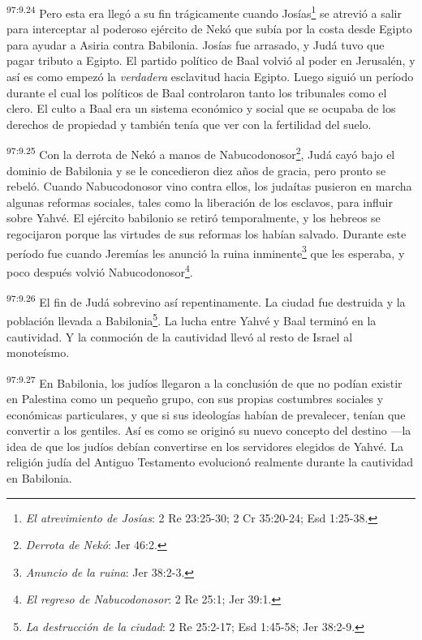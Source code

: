 \par
\textsuperscript{97:9.24} Pero esta era llegó a su fin trágicamente cuando Josías\footnote{\textit{El atrevimiento de Josías}: 2 Re 23:25-30; 2 Cr 35:20-24; Esd 1:25-38.} se atrevió a salir para interceptar al poderoso ejército de Nekó que subía por la costa desde Egipto para ayudar a Asiria contra Babilonia. Josías fue arrasado, y Judá tuvo que pagar tributo a Egipto. El partido político de Baal volvió al poder en Jerusalén, y así es como empezó la \textit{verdadera} esclavitud hacia Egipto. Luego siguió un período durante el cual los políticos de Baal controlaron tanto los tribunales como el clero. El culto a Baal era un sistema económico y social que se ocupaba de los derechos de propiedad y también tenía que ver con la fertilidad del suelo.

\par
\textsuperscript{97:9.25} Con la derrota de Nekó a manos de Nabucodonosor\footnote{\textit{Derrota de Nekó}: Jer 46:2.}, Judá cayó bajo el dominio de Babilonia y se le concedieron diez años de gracia, pero pronto se rebeló. Cuando Nabucodonosor vino contra ellos, los judaítas pusieron en marcha algunas reformas sociales, tales como la liberación de los esclavos, para influir sobre Yahvé. El ejército babilonio se retiró temporalmente, y los hebreos se regocijaron porque las virtudes de sus reformas los habían salvado. Durante este período fue cuando Jeremías les anunció la ruina inminente\footnote{\textit{Anuncio de la ruina}: Jer 38:2-3.} que les esperaba, y poco después volvió Nabucodonosor\footnote{\textit{El regreso de Nabucodonosor}: 2 Re 25:1; Jer 39:1.}.

\par
\textsuperscript{97:9.26} El fin de Judá sobrevino así repentinamente. La ciudad fue destruida y la población llevada a Babilonia\footnote{\textit{La destrucción de la ciudad}: 2 Re 25:2-17; Esd 1:45-58; Jer 38:2-9.}. La lucha entre Yahvé y Baal terminó en la cautividad. Y la conmoción de la cautividad llevó al resto de Israel al monoteísmo.

\par
\textsuperscript{97:9.27} En Babilonia, los judíos llegaron a la conclusión de que no podían existir en Palestina como un pequeño grupo, con sus propias costumbres sociales y económicas particulares, y que si sus ideologías habían de prevalecer, tenían que convertir a los gentiles. Así es como se originó su nuevo concepto del destino ---la idea de que los judíos debían convertirse en los servidores elegidos de Yahvé. La religión judía del Antiguo Testamento evolucionó realmente durante la cautividad en Babilonia.

